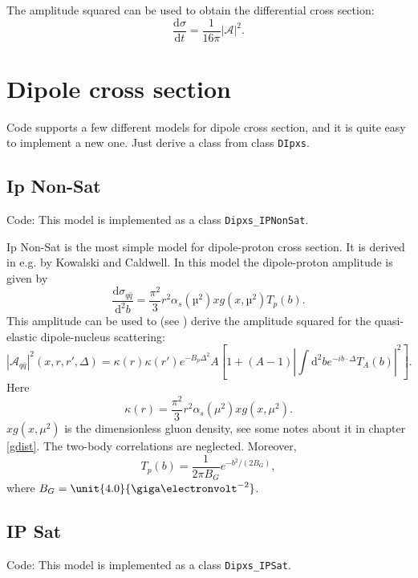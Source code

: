 \documentclass[a4paper,12pt]{article}
\newcommand{\code}[1]{\texttt{#1}}
\newcommand{\der}{\mathrm{d}}
\newcommand{\A}{\mathcal{A}}
\begin{document}
The amplitude squared can be used to obtain the differential cross section:
\begin{equation}
	\frac{\der \sigma}{\der t} = \frac{1}{16\pi} |\A|^2 .
\end{equation}

\section{Dipole cross section}
Code supports a few different models for dipole cross section, and it is quite easy to implement a new one. Just derive a class from class \code{DIpxs}.

\subsection{Ip Non-Sat}
Code: This model is implemented as a class \code{Dipxs\_IPNonSat}.

Ip Non-Sat is the most simple model for dipole-proton cross section. It is derived in e.g. \cite{Caldwell:2009ke} by Kowalski and Caldwell. In this model the dipole-proton amplitude is given by
\begin{equation}
	\frac{\der \sigma_{q\bar q}}{\der^2 b} = \frac{\pi^2}{3}r^2 \alpha_s(µ^2)xg(x,µ^2) T_p(b). 
\end{equation}
This amplitude can be used to (see \cite{Caldwell:2009ke}) derive the amplitude squared for the quasi-elastic dipole-nucleus scattering:
\begin{equation}
	|\A_{q\bar q}|^2(x,r,r',\Delta) = \kappa(r) \kappa(r') e^{-B_p \Delta^2} A  \left[ 1 + (A-1) \left| \int \der^2 b e^{-ib \cdot \Delta} T_A(b)\right|^2 \right] . 
\end{equation}
Here 
\begin{equation}
	\label{eq:kappa}
	\kappa(r) = \frac{\pi^2}{3}r^2\alpha_s(\mu^2)xg(x,\mu^2).
\end{equation}
$xg(x,\mu^2)$ is the dimensionless gluon density, see some notes about it in chapter \ref{gdist}. The two-body correlations are neglected. Moreover,
\begin{equation}
	T_p(b) = \frac{1}{2\pi B_G}e^{-b^2/(2B_G)},
\end{equation}
where $B_G=\unit{4.0}{\giga\electronvolt^{-2}}$.

\subsection{IP Sat}
\label{ipsat}
Code: This model is implemented as a class \code{Dipxs\_IPSat}.
\end{document}
